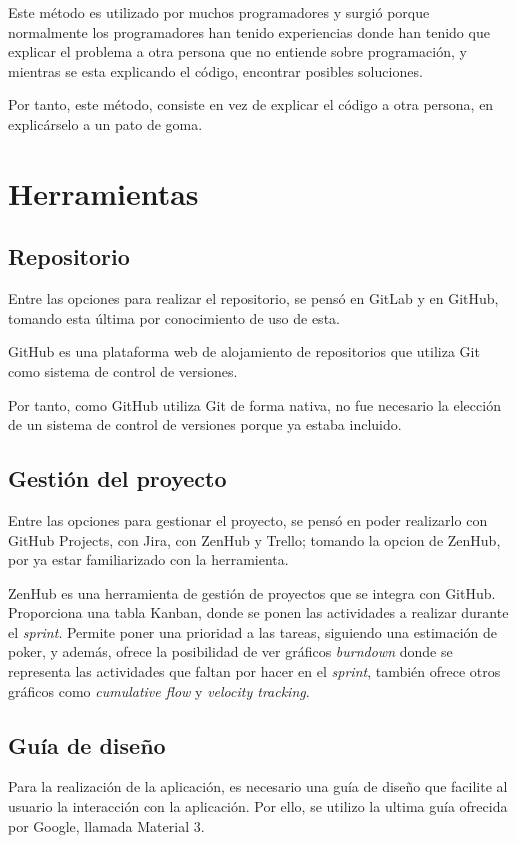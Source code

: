     Este método es utilizado por muchos programadores y surgió porque normalmente los programadores han tenido experiencias donde han tenido que explicar el problema a otra persona que no entiende sobre programación, y mientras se esta explicando el código, encontrar posibles soluciones. 
    
    Por tanto, este método, consiste en vez de explicar el código a otra persona, en explicárselo a un pato de goma.

\section{Herramientas}

    \subsection{Repositorio}
        Entre las opciones para realizar el repositorio, se pensó en GitLab y en GitHub, tomando esta última por conocimiento de uso de esta.

        GitHub es una plataforma web de alojamiento de repositorios que utiliza Git como sistema de control de versiones.

        Por tanto, como GitHub utiliza Git de forma nativa, no fue necesario la elección de un sistema de control de versiones porque ya estaba incluido.
    \subsection{Gestión del proyecto}
        Entre las opciones para gestionar el proyecto, se pensó en poder realizarlo con GitHub Projects, con Jira, con ZenHub y Trello; tomando la opcion de ZenHub, por ya estar familiarizado con la herramienta.

        ZenHub es una herramienta de gestión de proyectos que se integra con GitHub. Proporciona una tabla Kanban, donde se ponen las actividades a realizar durante el \textit{sprint}. Permite poner una prioridad a las tareas, siguiendo una estimación de poker, y además, ofrece la posibilidad de ver gráficos \textit{burndown} donde se representa las actividades que faltan por hacer en el \textit{sprint}, también ofrece otros gráficos como \textit{cumulative flow} y \textit{velocity tracking}.

    \subsection{Guía de diseño}
        Para la realización de la aplicación, es necesario una guía de diseño que facilite al usuario la interacción con la aplicación. Por ello, se utilizo la ultima guía ofrecida por Google, llamada Material 3.

